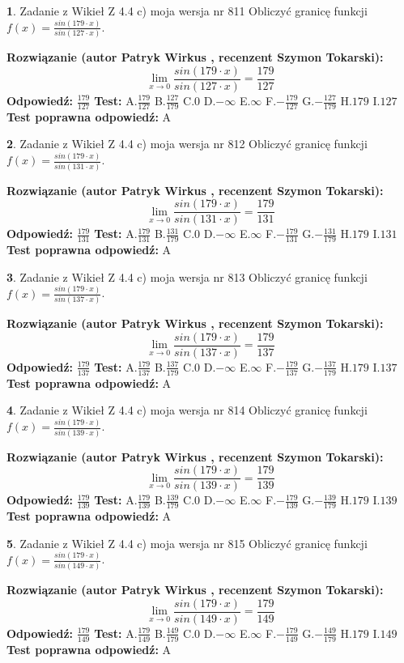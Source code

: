 \documentclass[12pt, a4paper]{article}
\theoremstyle{definition} %
\newtheorem{zad}{}
\newcommand{\zadStart}[1]{\begin{zad}#1\newline}
\newcommand{\zadStop}{\end{zad}}
\newcommand{\rozwStart}[2]{\noindent \textbf{Rozwiązanie (autor #1 , recenzent #2): }\newline}
\newcommand{\rozwStop}{\newline}
\newcommand{\odpStart}{\noindent \textbf{Odpowiedź:}\newline}
\newcommand{\odpStop}{\newline}
\newcommand{\testStart}{\noindent \textbf{Test:}\newline}
\newcommand{\testStop}{\newline}
\newcommand{\kluczStart}{\noindent \textbf{Test poprawna odpowiedź:}\newline}
\newcommand{\kluczStop}{\newline}
\begin{document}
\zadStart{Zadanie z Wikieł Z 4.4 c) moja wersja nr 811}
Obliczyć granicę funkcji $f(x)=\frac{sin(179\cdot x)}{sin(127\cdot x)}$.
\zadStop
\rozwStart{Patryk Wirkus}{Szymon Tokarski}
$$\lim\limits_{x\to 0}\frac{sin(179\cdot x)}{sin(127\cdot x)}=
\frac{179}{127}$$
\rozwStop
\odpStart
$\frac{179}{127}$
\odpStop
\testStart
A.$\frac{179}{127}$
B.$\frac{127}{179}$
C.$0$
D.$-\infty$
E.$\infty$
F.$-\frac{179}{127}$
G.$-\frac{127}{179}$
H.$179$
I.$127$
\testStop
\kluczStart
A
\kluczStop



\zadStart{Zadanie z Wikieł Z 4.4 c) moja wersja nr 812}
Obliczyć granicę funkcji $f(x)=\frac{sin(179\cdot x)}{sin(131\cdot x)}$.
\zadStop
\rozwStart{Patryk Wirkus}{Szymon Tokarski}
$$\lim\limits_{x\to 0}\frac{sin(179\cdot x)}{sin(131\cdot x)}=
\frac{179}{131}$$
\rozwStop
\odpStart
$\frac{179}{131}$
\odpStop
\testStart
A.$\frac{179}{131}$
B.$\frac{131}{179}$
C.$0$
D.$-\infty$
E.$\infty$
F.$-\frac{179}{131}$
G.$-\frac{131}{179}$
H.$179$
I.$131$
\testStop
\kluczStart
A
\kluczStop



\zadStart{Zadanie z Wikieł Z 4.4 c) moja wersja nr 813}
Obliczyć granicę funkcji $f(x)=\frac{sin(179\cdot x)}{sin(137\cdot x)}$.
\zadStop
\rozwStart{Patryk Wirkus}{Szymon Tokarski}
$$\lim\limits_{x\to 0}\frac{sin(179\cdot x)}{sin(137\cdot x)}=
\frac{179}{137}$$
\rozwStop
\odpStart
$\frac{179}{137}$
\odpStop
\testStart
A.$\frac{179}{137}$
B.$\frac{137}{179}$
C.$0$
D.$-\infty$
E.$\infty$
F.$-\frac{179}{137}$
G.$-\frac{137}{179}$
H.$179$
I.$137$
\testStop
\kluczStart
A
\kluczStop



\zadStart{Zadanie z Wikieł Z 4.4 c) moja wersja nr 814}
Obliczyć granicę funkcji $f(x)=\frac{sin(179\cdot x)}{sin(139\cdot x)}$.
\zadStop
\rozwStart{Patryk Wirkus}{Szymon Tokarski}
$$\lim\limits_{x\to 0}\frac{sin(179\cdot x)}{sin(139\cdot x)}=
\frac{179}{139}$$
\rozwStop
\odpStart
$\frac{179}{139}$
\odpStop
\testStart
A.$\frac{179}{139}$
B.$\frac{139}{179}$
C.$0$
D.$-\infty$
E.$\infty$
F.$-\frac{179}{139}$
G.$-\frac{139}{179}$
H.$179$
I.$139$
\testStop
\kluczStart
A
\kluczStop



\zadStart{Zadanie z Wikieł Z 4.4 c) moja wersja nr 815}
Obliczyć granicę funkcji $f(x)=\frac{sin(179\cdot x)}{sin(149\cdot x)}$.
\zadStop
\rozwStart{Patryk Wirkus}{Szymon Tokarski}
$$\lim\limits_{x\to 0}\frac{sin(179\cdot x)}{sin(149\cdot x)}=
\frac{179}{149}$$
\rozwStop
\odpStart
$\frac{179}{149}$
\odpStop
\testStart
A.$\frac{179}{149}$
B.$\frac{149}{179}$
C.$0$
D.$-\infty$
E.$\infty$
F.$-\frac{179}{149}$
G.$-\frac{149}{179}$
H.$179$
I.$149$
\testStop
\kluczStart
A
\kluczStop
\end{document}

